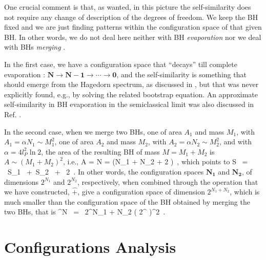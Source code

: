 \documentclass[aps,prd,showkeys,nofootinbib,superscriptaddress]{revtex4-2}
\begin{document}
One crucial comment is that, as wanted, in this picture the self-similarity does not require any change of description of the degrees of freedom. We keep the BH fixed and we are just finding patterns within the configuration space of that given BH. In other words, we do not deal here neither with BH \textit{evaporation} \cite{haw1} nor we deal with BHs \textit{merging} \cite{abbotts}.

In the first case, we have a configuration space that ``decays'' till complete evaporation \cite{aismal}: $\mathbf{N} \to \mathbf{N-1} \to \cdots \to \mathbf{0}$, and the self-similarity is something that should emerge from the Hagedorn spectrum, as discussed in \cite{susskind1,veneziano1}, but that was never explicitly found, e.g., by solving the related bootstrap equation. An approximate self-similarity in BH evaporation in the semiclassical limit was also discussed in Ref. \cite{Dvali:2012gb}.

In the second case, when we merge two BHs, one of area $A_1$ and mass $M_1$, with $A_1 = \alpha N_1 \sim M_1^2$, one of area $A_2$ and mass $M_2$, with $A_2 = \alpha N_2 \sim M_2^2$, and with $\alpha = 4 l_P^2  \ln 2 $, the area of the resulting BH of mass $M = M_1 + M_2$ is
$A \sim (M_1 + M_2)^2$, i.e.,
\be
A = \alpha N = \alpha (N_1 + N_2 + 2 ) \,,
\ee
which points to
\be
S \ = \ S_1 \ +\  S_2 \ + \  2  \,.
\ee
In other words, the configuration spaces $\mathbf{N_1}$ and $\mathbf{N_2}$, of dimensions $2^{N_1}$ and $2^{N_2}$, respectively, when combined through the operation that we have constructed, $\hat{+}$, give a configuration space of dimension $2^{N_1 + N_2}$, which is much smaller than the configuration space of the BH obtained by merging the two BHs, that is
^N \ = \  2^{N_1 + N_2} \times \left( 2^{} \right)^2 \,.
\ee


\section{Configurations Analysis}\label{sectionOnLogA}

\end{document}
